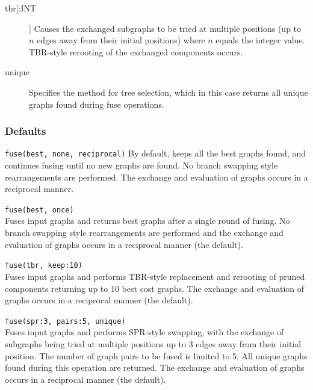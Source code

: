 \begin{description}
		\item [tbr[:INT]] Causes the exchanged subgraphs to be tried at multiple positions (up to 
		$n$ edges away from their initial positions) where $n$ equals the integer value. TBR-style 
		rerooting of the exchanged components occurs.
		
		\item [unique] Specifies the method for tree selection, which in this case returns all unique 
		graphs found during fuse operations.	
		
	\end{description}	
	
	\subsubsection{Defaults}
		\texttt{fuse(best, none, reciprocal)} By default, \phyg keeps all the best graphs found, 
		and continues fusing until no new graphs are found. No branch swapping style rearrangements 
		are performed. The exchange and evaluation of graphs occurs in a reciprocal manner. 
			
	\begin{example}
	
		\item{\texttt{fuse(best, once)}\\Fuses input graphs and returns best graphs after a single 
		round of fusing. No branch swapping style rearrangements are performed and the exchange 
		and evaluation of graphs occurs in a reciprocal manner (the default).}
		
		\item{\texttt{fuse(tbr, keep:10)} \\Fuses input graphs and performs TBR-style replacement 
		and rerooting of pruned components returning up to 10 best cost graphs. The exchange 
		and evaluation of graphs occurs in a reciprocal manner (the default).}
		
		\item{\texttt{fuse(spr:3, pairs:5, unique)} \\Fuses input graphs and performs SPR-style swapping, 
		with the exchange of subgraphs being tried at multiple positions up to 3 edges away from their 
		initial position. The number of graph pairs to be fused is limited to 5. All unique graphs found
		during this operation are returned. The exchange and evaluation of graphs occurs in a reciprocal 
		manner (the default)}.
		
	\end{example}

